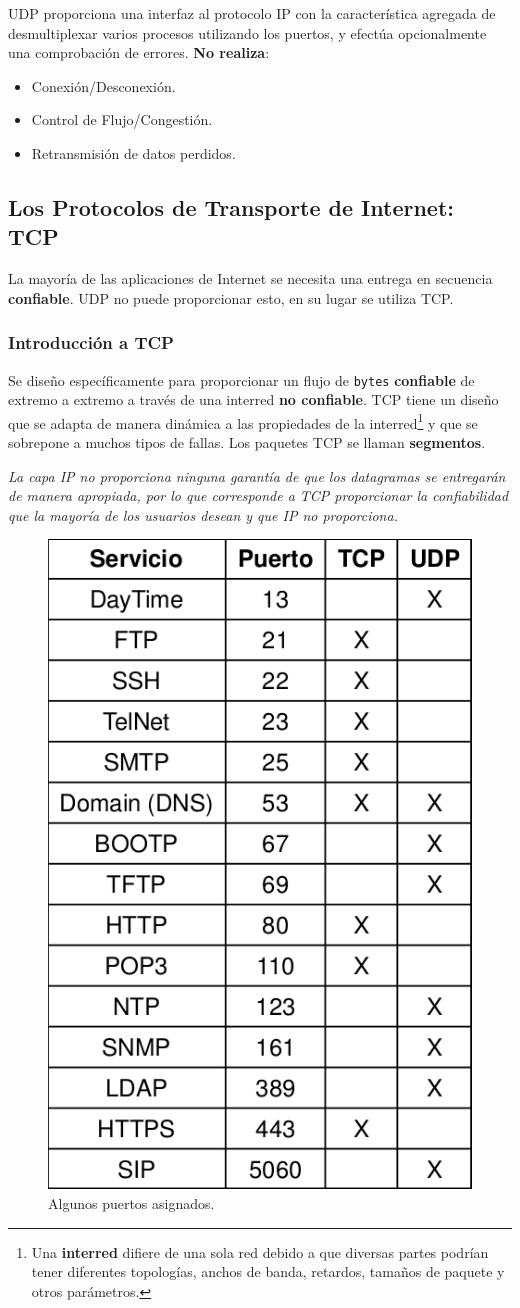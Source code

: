 \documentclass[10pt,a4paper]{article}
\begin{document}
UDP proporciona una interfaz al protocolo IP con la característica agregada de desmultiplexar varios procesos utilizando los puertos, y efectúa opcionalmente una comprobación de errores. \textbf{No realiza}:

\begin{multicols}{2}
\begin{itemize}
\item Conexión/Desconexión.
\item Control de Flujo/Congestión.
\item Retransmisión de datos perdidos.
\end{itemize}
\end{multicols}

\subsection{Los Protocolos de Transporte de Internet: TCP}

La mayoría de las aplicaciones de Internet se necesita una entrega en secuencia \textbf{confiable}. UDP no puede proporcionar esto, en su lugar se utiliza TCP.

\subsubsection{Introducción a TCP}

Se diseño específicamente para proporcionar un flujo de \texttt{bytes} \textbf{confiable} de extremo a extremo a través de una interred \textbf{no confiable}. TCP tiene un diseño que se adapta de manera dinámica a las propiedades de la interred\footnote{Una \textbf{interred} difiere de una sola red debido a que diversas partes podrían tener diferentes topologías, anchos de banda, retardos, tamaños de paquete y otros parámetros.} y que se sobrepone a muchos tipos de fallas. Los paquetes TCP se llaman \textbf{segmentos}.

\textit{La capa IP no proporciona ninguna garantía de que los datagramas se entregarán de manera apropiada, por lo que corresponde a TCP proporcionar la confiabilidad que la mayoría de los usuarios desean y que IP no proporciona.}

\begin{figure}
  \caption{Algunos puertos asignados.}
  \label{fig:puertos}
  \centering
  \hbox{\includegraphics[width=0.35\textwidth-\fboxrule-\fboxrule]{imgs/puertos.png}}
\end{figure}
\end{document}
